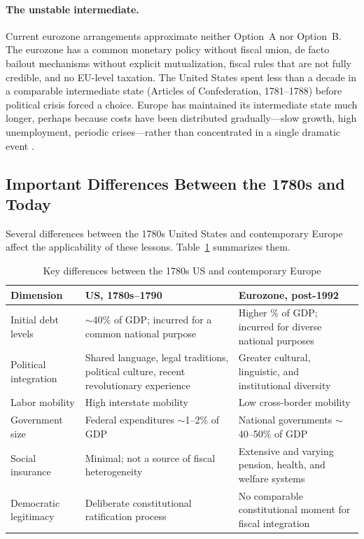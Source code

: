 \documentclass[12pt]{article}
\begin{document}
\paragraph{The unstable intermediate.}
Current eurozone arrangements approximate neither Option~A nor Option~B.
The eurozone has a common monetary policy without fiscal union, de facto
bailout mechanisms without explicit mutualization, fiscal rules that are
not fully credible, and no EU-level taxation. The United States spent
less than a decade in a comparable intermediate state (Articles of
Confederation, 1781--1788) before political crisis forced a choice.
Europe has maintained its intermediate state much longer, perhaps because
costs have been distributed gradually---slow growth, high unemployment,
periodic crises---rather than concentrated in a single dramatic event
\citep{BrunnermeierJamesLandau2016, HenningKessler2012}.

\subsection{Important Differences Between the 1780s and Today}

Several differences between the 1780s United States and contemporary
Europe affect the applicability of these lessons. Table~\ref{tab:diffs}
summarizes them.

\begin{table}[htbp]
\centering
\small
\caption{Key differences between the 1780s US and contemporary Europe}
\label{tab:diffs}
\begin{tabular}{@{}p{3.2cm}p{5.5cm}p{5.5cm}@{}}
\toprule
\textbf{Dimension} & \textbf{US, 1780s--1790} &
\textbf{Eurozone, post-1992} \\
\midrule
Initial debt levels & $\sim$40\% of GDP; incurred for a common national
  purpose & Higher \% of GDP; incurred for diverse national purposes \\
Political integration & Shared language, legal traditions, political
  culture, recent revolutionary experience & Greater cultural,
  linguistic, and institutional diversity \\
Labor mobility & High interstate mobility & Low cross-border mobility \\
Government size & Federal expenditures $\sim$1--2\% of GDP & National
  governments $\sim$40--50\% of GDP \\
Social insurance & Minimal; not a source of fiscal heterogeneity &
  Extensive and varying pension, health, and welfare systems \\
Democratic legitimacy & Deliberate constitutional ratification process &
  No comparable constitutional moment for fiscal integration \\
\bottomrule
\end{tabular}
\end{table}
\end{document}
